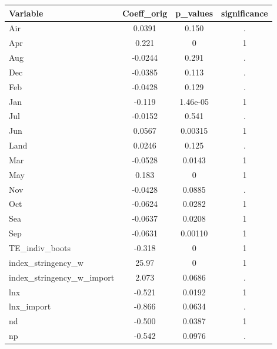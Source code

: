 \documentclass[]{article}
\begin{document}
\begin{tabular}{lccc} \hline
Variable & Coeff\_orig & p\_values & significance \\ \hline
Air & 0.0391 & 0.150 & . \\
Apr & 0.221 & 0 & 1 \\
Aug & -0.0244 & 0.291 & . \\
Dec & -0.0385 & 0.113 & . \\
Feb & -0.0428 & 0.129 & . \\
Jan & -0.119 & 1.46e-05 & 1 \\
Jul & -0.0152 & 0.541 & . \\
Jun & 0.0567 & 0.00315 & 1 \\
Land & 0.0246 & 0.125 & . \\
Mar & -0.0528 & 0.0143 & 1 \\
May & 0.183 & 0 & 1 \\
Nov & -0.0428 & 0.0885 & . \\
Oct & -0.0624 & 0.0282 & 1 \\
Sea & -0.0637 & 0.0208 & 1 \\
Sep & -0.0631 & 0.00110 & 1 \\
TE\_indiv\_boots & -0.318 & 0 & 1 \\
index\_stringency\_w & 25.97 & 0 & 1 \\
index\_stringency\_w\_import & 2.073 & 0.0686 & . \\
lnx & -0.521 & 0.0192 & 1 \\
lnx\_import & -0.866 & 0.0634 & . \\
nd & -0.500 & 0.0387 & 1 \\
 np & -0.542 & 0.0976 & . \\ \hline
\end{tabular}
\end{document}
